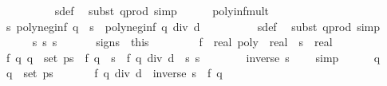 \begin{isabellebody}
\ \ \ \ \ \ \ \ \isamarkupfalse%
\ s{\isacharprime}{\isacharunderscore}def\ \isamarkupfalse%
\ {\isacharparenleft}subst\ q{\isacharunderscore}prod{\isacharcomma}\ simp{\isacharparenright}\isanewline
\ \ \ \ \isamarkupfalse%
\ poly{\isacharunderscore}inf{\isacharunderscore}mult\ \isamarkupfalse%
\ s{}{\isacharcolon}\ {\isachardoublequoteopen}poly{\isacharunderscore}neg{\isacharunderscore}inf\ q\ {\isacharequal}\ s{\isacharprime}{\isacharprime}\ {\isacharasterisk}\ poly{\isacharunderscore}neg{\isacharunderscore}inf\ {\isacharparenleft}q\ div\ d{\isacharparenright}{\isachardoublequoteclose}\isanewline
\ \ \ \ \ \ \ \ \isamarkupfalse%
\ s{\isacharprime}{\isacharprime}{\isacharunderscore}def\ \isamarkupfalse%
\ {\isacharparenleft}subst\ q{\isacharunderscore}prod{\isacharcomma}\ simp{\isacharparenright}\isanewline
\ \ \ \ \isamarkupfalse%
\ s{}\ s{}\ s{}\isanewline
\ \ \isacommand{{\isacharbraceright}}\isamarkupfalse%
\isanewline
\ \ \isamarkupfalse%
\ signs\ {\isacharequal}\ this\isanewline
\isanewline
\ \ \isacommand{{\isacharbraceleft}}\isamarkupfalse%
\isanewline
\ \ \ \ \isamarkupfalse%
\ f\ {\isacharcolon}{\isacharcolon}\ {\isachardoublequoteopen}real\ poly\ {\isasymRightarrow}\ real{\isachardoublequoteclose}\ \ s\ {\isacharcolon}{\isacharcolon}\ real\isanewline
\ \ \ \ \isamarkupfalse%
\ f{\isacharcolon}\ {\isachardoublequoteopen}{\isasymAnd}q{\isachardot}\ q\ {\isasymin}\ set\ ps\ {\isasymLongrightarrow}\ f\ q\ {\isacharequal}\ s\ {\isacharasterisk}\ f\ {\isacharparenleft}q\ div\ d{\isacharparenright}{\isachardoublequoteclose}\ \ s{\isacharcolon}\ {\isachardoublequoteopen}s\ {\isasymnoteq}\ {}{\isachardoublequoteclose}\isanewline
\ \ \ \ \isamarkupfalse%
\ {\isachardoublequoteopen}inverse\ s\ {\isasymnoteq}\ {}{\isachardoublequoteclose}\ \isamarkupfalse%
\ simp\isanewline
\ \ \ \ \isacommand{{\isacharbraceleft}}\isamarkupfalse%
\isamarkupfalse%
\ q\ \isamarkupfalse%
\ {\isachardoublequoteopen}q\ {\isasymin}\ set\ ps{\isachardoublequoteclose}\isanewline
\ \ \ \ \ \isamarkupfalse%
\ {\isachardoublequoteopen}f\ {\isacharparenleft}q\ div\ d{\isacharparenright}\ {\isacharequal}\ inverse\ s\ {\isacharasterisk}\ f\ q{\isachardoublequoteclose}\ \isanewline
\ \ \ \ \ \ \ \ \ \isamarkupfalse%

\end{isabellebody}
